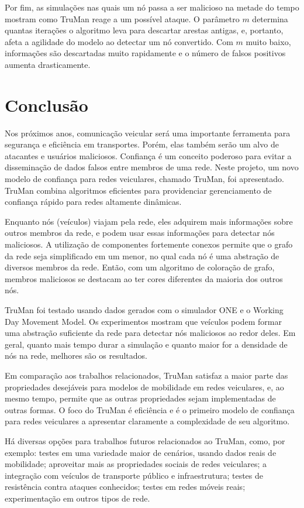 \begin{resumoextendido}
	Por fim, as simulações nas quais um nó passa a ser malicioso na metade do tempo mostram como TruMan reage a um possível ataque.
	O parâmetro $m$ determina quantas iterações o algoritmo leva para descartar arestas antigas, e, portanto, afeta a agilidade do modelo ao detectar um nó convertido.
	Com $m$ muito baixo, informações são descartadas muito rapidamente e o número de falsos positivos aumenta drasticamente.
	
	\section*{Conclusão}
	
	Nos próximos anos, comunicação veicular será uma importante ferramenta para segurança e eficiência em transportes.
	Porém, elas também serão um alvo de atacantes e usuários maliciosos.
	Confiança é um conceito poderoso para evitar a disseminação de dados falsos entre membros de uma rede.
	Neste projeto, um novo modelo de confiança para redes veiculares, chamado TruMan, foi apresentado.
	TruMan combina algoritmos eficientes para providenciar gerenciamento de confiança rápido para redes altamente dinâmicas.
	
	Enquanto nós (veículos) viajam pela rede, eles adquirem mais informações sobre outros membros da rede, e podem usar essas informações para detectar nós maliciosos.
	A utilização de componentes fortemente conexos permite que o grafo da rede seja simplificado em um menor, no qual cada nó é uma abstração de diversos membros da rede.
	Então, com um algoritmo de coloração de grafo, membros maliciosos se destacam ao ter cores diferentes da maioria dos outros nós.
	
	TruMan foi testado usando dados gerados com o simulador ONE e o Working Day Movement Model.
	Os experimentos mostram que veículos podem formar uma abstração suficiente da rede para detectar nós maliciosos ao redor deles.
	Em geral, quanto mais tempo durar a simulação e quanto maior for a densidade de nós na rede, melhores são os resultados.
	
	Em comparação aos trabalhos relacionados, TruMan satisfaz a maior parte das propriedades desejáveis para modelos de mobilidade em redes veiculares, e, ao mesmo tempo, permite que as outras propriedades sejam implementadas de outras formas.
	O foco do TruMan é eficiência e é o primeiro modelo de confiança para redes veiculares a apresentar claramente a complexidade de seu algoritmo.
	
	Há diversas opções para trabalhos futuros relacionados ao TruMan, como, por exemplo:
	testes em uma variedade maior de cenários, usando dados reais de mobilidade;
	aproveitar mais as propriedades sociais de redes veiculares;
	a integração com veículos de transporte público e infraestrutura;
	testes de resistência contra ataques conhecidos;
	testes em redes móveis reais;
	experimentação em outros tipos de rede.
	
	
\end{resumoextendido}